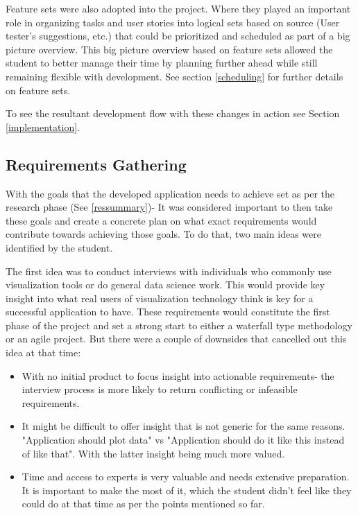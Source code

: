 Feature sets were also adopted into the project. Where they played an important role in organizing tasks and user stories into logical sets based on source (User tester's suggestions, etc.) that could be prioritized and scheduled as part of a big picture overview. This big picture overview based on feature sets allowed the student to better manage their time by planning further ahead while still remaining flexible with development. See section \ref{scheduling} for further details on feature sets.

To see the resultant development flow with these changes in action see Section \ref{implementation}.

\subsection{Requirements Gathering} \label{reqgat}
With the goals that the developed application needs to achieve set as per the research phase (See \ref{ressummary})- It was considered important to then take these goals and create a concrete plan on what exact requirements would contribute towards achieving those goals. To do that, two main ideas were identified by the student.

The first idea was to conduct interviews with individuals who commonly use visualization tools or do general data science work. This would provide key insight into what real users of visualization technology think is key for a successful application to have. These requirements would constitute the first phase of the project and set a strong start to either a waterfall type methodology or an agile project.
But there were a couple of downsides that cancelled out this idea at that time:
\begin{itemize}
    \item With no initial product to focus insight into actionable requirements- the interview process is more likely to return conflicting or infeasible requirements.
    \item It might be difficult to offer insight that is not generic for the same reasons. "Application should plot data" vs "Application should do it like this instead of like that". With the latter insight being much more valued.
    \item Time and access to experts is very valuable and needs extensive preparation. It is important to make the most of it, which the student didn’t feel like they could do at that time as per the points mentioned so far.
\end{itemize}

